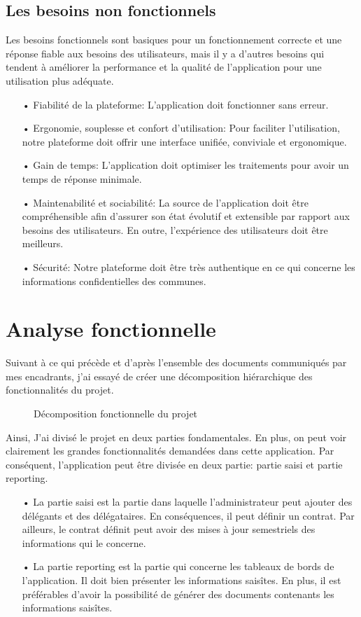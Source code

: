\subsection{Les besoins non fonctionnels}
Les besoins fonctionnels sont basiques pour un fonctionnement
correcte et une réponse fiable aux besoins des utilisateurs, mais il y a d'autres besoins qui tendent à améliorer la performance et la qualité de
l'application pour une utilisation plus adéquate.
\begin{itemize}
    \item[•] Fiabilité de la plateforme: L’application doit
          fonctionner sans erreur.
    \item[•] Ergonomie, souplesse et confort d’utilisation: Pour
          faciliter l’utilisation, notre plateforme doit offrir une interface unifiée,
          conviviale et ergonomique.
    \item[•] Gain de temps: L'application doit optimiser les
          traitements pour avoir un temps de réponse minimale.
    \item[•] Maintenabilité et sociabilité: La source de l'application doit être compréhensible
          afin d’assurer son état évolutif et extensible par rapport aux besoins des utilisateurs. En outre, l’expérience des utilisateurs doit être meilleurs.
    \item[•] Sécurité: Notre plateforme doit  être très authentique en ce qui concerne les informations confidentielles des communes.
\end{itemize}
\section{Analyse fonctionnelle}
Suivant à ce qui précède et d’après l’ensemble des documents communiqués par mes encadrants, j’ai essayé de créer une décomposition hiérarchique des fonctionnalités du projet.
\begin{figure}[H]
    \begin{center}
        \caption{Décomposition fonctionnelle du projet}
    \end{center}
\end{figure}
Ainsi, J'ai divisé le projet en deux parties fondamentales. En plus, on peut voir clairement les grandes fonctionnalités demandées dans cette application. Par conséquent, l'application peut être divisée en deux partie: partie saisi et partie reporting.
\begin{itemize}
    \item[•] La partie saisi est la partie dans laquelle l'administrateur peut ajouter des délégants et des délégataires. En conséquences, il peut définir un contrat. Par ailleurs, le contrat définit peut avoir des mises à jour semestriels des informations qui le concerne.
    \item[•] La partie reporting est la partie qui concerne les tableaux de bords de l’application. Il doit bien présenter les informations saisîtes. En plus, il est préférables d'avoir la possibilité de générer des documents contenants les informations saisîtes.
\end{itemize}

